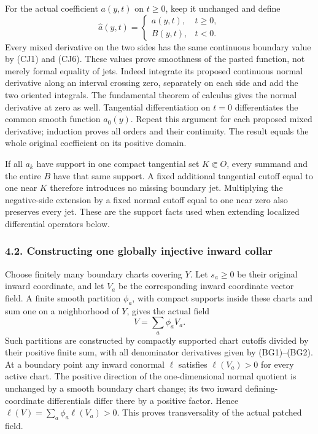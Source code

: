\documentclass[
  11pt,
]{article}
\begin{document}
For the actual coefficient \(a(y,t)\) on \(t\geq0\), keep it unchanged
and define \[
 \widehat a(y,t)=
 \begin{cases}
   a(y,t),&t\geq0,\\
   B(y,t),&t<0.
 \end{cases}
 \tag{CJ7}
\] Every mixed derivative on the two sides has the same continuous
boundary value by (CJ1) and (CJ6). These values prove smoothness of the
pasted function, not merely formal equality of jets. Indeed integrate
its proposed continuous normal derivative along an interval crossing
zero, separately on each side and add the two oriented integrals. The
fundamental theorem of calculus gives the normal derivative at zero as
well. Tangential differentiation on \(t=0\) differentiates the common
smooth function \(a_0(y)\). Repeat this argument for each proposed mixed
derivative; induction proves all orders and their continuity. The result
equals the whole original coefficient on its positive domain.

If all \(a_k\) have support in one compact tangential set
\(K\Subset O\), every summand and the entire \(B\) have that same
support. A fixed additional tangential cutoff equal to one near \(K\)
therefore introduces no missing boundary jet. Multiplying the
negative-side extension by a fixed normal cutoff equal to one near zero
also preserves every jet. These are the support facts used when
extending localized differential operators below.

\subsubsection{4.2. Constructing one globally injective inward
collar}\label{constructing-one-globally-injective-inward-collar}

Choose finitely many boundary charts covering \(Y\). Let \(s_a\geq0\) be
their original inward coordinate, and let \(V_a\) be the corresponding
inward coordinate vector field. A finite smooth partition \(\phi_a\),
with compact supports inside these charts and sum one on a neighborhood
of \(Y\), gives the actual field \[
 V=\sum_a\phi_a V_a .
 \tag{CJ8}
\] Such partitions are constructed by compactly supported chart cutoffs
divided by their positive finite sum, with all denominator derivatives
given by (BG1)--(BG2). At a boundary point any inward conormal \(\ell\)
satisfies \(\ell(V_a)>0\) for every active chart. The positive direction
of the one-dimensional normal quotient is unchanged by a smooth boundary
chart change; its two inward defining-coordinate differentials differ
there by a positive factor. Hence \(\ell(V)=\sum_a\phi_a\ell(V_a)>0\).
This proves transversality of the actual patched field.
\end{document}

